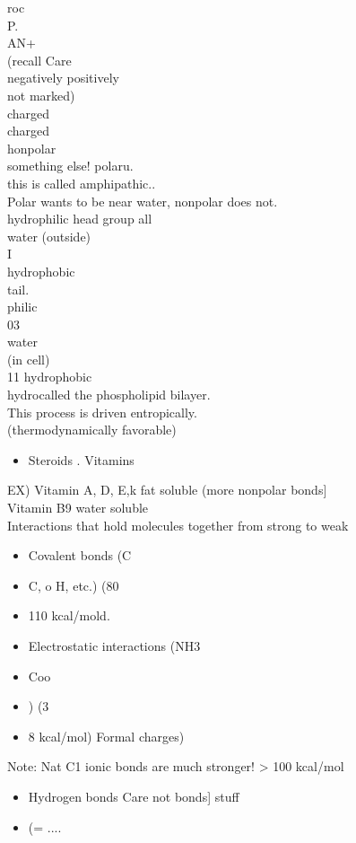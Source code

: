 \documentclass{article}
\begin{document}
roc\\
P.\\
AN+\\
(recall Care\\
negatively positively\\
not marked)\\
charged\\
charged\\
honpolar\\
something else! polaru.\\
this is called amphipathic..\\
Polar wants to be near water, nonpolar does not.\\
hydrophilic head group all\\
water (outside)\\
I\\
hydrophobic\\
tail.\\
philic\\
03\\
water\\
(in cell)\\
11 hydrophobic\\
hydrocalled the phospholipid bilayer.\\
This process is driven entropically.\\
(thermodynamically favorable)\\
\begin{itemize}\item Steroids
. Vitamins
\end{itemize}
EX) Vitamin A, D, E,k fat soluble (more nonpolar bonds{]}\\
Vitamin B9 water soluble\\
Interactions that hold molecules together from strong to weak\\
\begin{itemize}\item  Covalent bonds (C\item C, o H, etc.) (80\item 110 kcal/mold.
\item  Electrostatic interactions (NH3 \item  Coo\item ) (3\item 8 kcal/mol) Formal charges)
\end{itemize}
Note: Nat C1 ionic bonds are much stronger! > 100 kcal/mol\\
\begin{itemize}\item  Hydrogen bonds Care not bonds{]}
stuff \item  (= ....
\end{itemize}
\end{document}
